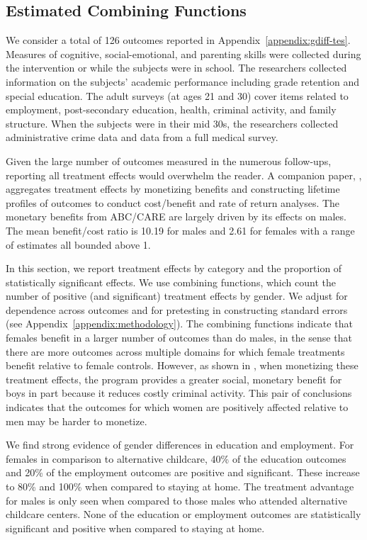 \subsection{Estimated Combining Functions}

We consider a total of 126 outcomes reported in Appendix~\ref{appendix:gdiff-tes}. Measures of cognitive, social-emotional, and parenting skills were collected during the intervention or while the subjects were in school. The researchers collected information on the subjects' academic performance including grade retention and special education. The adult surveys (at ages 21 and 30) cover items related to employment, post-secondary education, health, criminal activity, and family structure. When the subjects were in their mid 30s, the researchers collected administrative crime data and data from a full medical survey.

Given the large number of outcomes measured in the numerous follow-ups, reporting all treatment effects would overwhelm the reader. A companion paper, \citet{Garcia_Heckman_Leaf_etal_2017_Comp_CBA_Unpublished}, aggregates treatment effects by monetizing benefits and constructing lifetime profiles of outcomes to conduct cost/benefit and rate of return analyses. The monetary benefits from ABC/CARE are largely driven by its effects on males. The mean benefit/cost ratio is 10.19 for males and 2.61 for females with a range of estimates all bounded above 1.

In this section, we report treatment effects by category and the proportion of statistically significant effects. We use combining functions, which count the number of positive (and significant) treatment effects by gender. We adjust for dependence across outcomes and for pretesting in constructing standard errors (see Appendix~\ref{appendix:methodology}). The combining functions indicate that females benefit in a larger number of outcomes   than do males, in the sense that there are more outcomes across multiple domains for which female treatments benefit relative to female controls. However, as shown in \cite{Garcia_Heckman_Leaf_etal_2017_Comp_CBA_Unpublished}, when monetizing these treatment effects, the program provides a greater social, monetary benefit for boys in part because it reduces costly criminal activity. This pair of conclusions indicates that the outcomes for which women are positively affected relative to men may be harder to monetize.  

We find strong evidence of gender differences in education and employment. For females in comparison to alternative childcare, 40\% of the education outcomes and 20\% of the employment outcomes are positive and significant. These increase to 80\% and 100\% when compared to staying at home. The treatment advantage for males is only seen when compared to those males who attended alternative childcare centers. None of the education or employment outcomes are statistically significant and positive when compared to staying at home.

